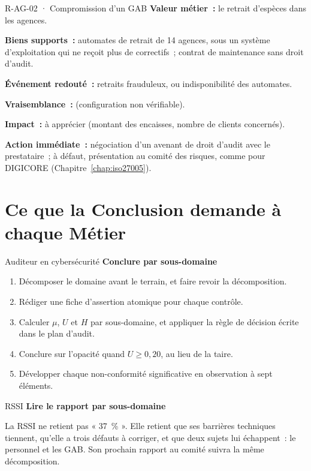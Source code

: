 \begin{boxobjet}{R-AG-02 · Compromission d'un GAB}
\textbf{Valeur métier~:} le retrait d'espèces dans les agences.

\textbf{Biens supports~:} automates de retrait de 14 agences, sous un
système d'exploitation qui ne reçoit plus de correctifs~; contrat de
maintenance sans droit d'audit.

\textbf{Événement redouté~:} retraits frauduleux, ou indisponibilité des
automates.

\textbf{Vraisemblance~:} \NEK{} (configuration non vérifiable).

\textbf{Impact~:} à apprécier (montant des encaisses, nombre de clients
concernés).

\textbf{Action immédiate~:} négociation d'un avenant de droit d'audit avec
le prestataire~; à défaut, présentation au comité des risques, comme pour
DIGICORE (Chapitre~\ref{chap:iso27005}).
\end{boxobjet}

\section{Ce que la Conclusion demande à chaque Métier}
\label{sec:c07-metiers}

\begin{boxmetier}{Auditeur en cybersécurité}
\textbf{Conclure par sous-domaine}
\begin{enumerate}
    \item Décomposer le domaine avant le terrain, et faire revoir la
          décomposition.
    \item Rédiger une fiche d'assertion atomique pour chaque contrôle.
    \item Calculer $\mu$, $U$ et $H$ par sous-domaine, et appliquer la règle
          de décision écrite dans le plan d'audit.
    \item Conclure sur l'opacité quand $U \geq 0{,}20$, au lieu de la taire.
    \item Développer chaque non-conformité significative en observation à
          sept éléments.
\end{enumerate}
\end{boxmetier}

\begin{boxmetier}{RSSI}
\textbf{Lire le rapport par sous-domaine}

La RSSI ne retient pas « 37~\% ». Elle retient que ses barrières
techniques tiennent, qu'elle a trois défauts à corriger, et que deux
sujets lui échappent~: le personnel et les GAB. Son prochain rapport au
comité suivra la même décomposition.
\end{boxmetier}

